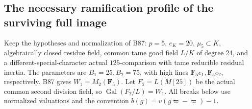 \subsection{The necessary ramification profile of the surviving full image}

Keep the hypotheses and normalization of B87:
\(p=5\), \(e_K=20\), \(\mu_5\subset K\),
algebraically closed residue field, common tame good
field \(L/K\) of degree 24, and a different-special-character
actual \(125\)-comparison with tame reducible residual inertia.
The parameters are \(B_1=25,B_2=75\), with high lines
\(\mathbf F_5e_1,\mathbf F_5e_2\), respectively.
B87 gives \(W_1=M_2(\mathbf F_5)\). Let
\(F_2=L(M[25])\) be the actual common second division field,
so \(\operatorname{Gal}(F_2/L)=W_1\).
All breaks below use normalized valuations and the convention
\(b(g)=v(g\varpi-\varpi)-1\).

